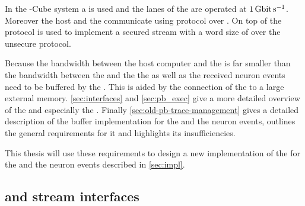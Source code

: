In the \BSSTwo{}-Cube\autocite{ref:bss_cube} system a \Xilinx{}  \FPGA{} is used and the \LVDS{} lanes of the \ASIC{} are operated at $\SI{1}{\giga\bit\per\second}$. Moreover the host and the \FPGA{} communicate using \UDP{} protocol over \Gigabitethernet{}. On top of \UDP{} the \HostARQ{}\autocite{ref:hostarq} protocol is used to implement a secured stream with a word size of \PhyWordSize{} over the unsecure \UDP{} protocol.

Because the bandwidth between the host computer and the \FPGA{} is far smaller than the bandwidth between the \FPGA{} and the \ASIC{} the \PlaybackProgram{} as well as the received neuron events need to be buffered by the \FPGA{}. This is aided by the connection of the \FPGA{} to a large external memory.
\autoref{sec:interfaces} and \autoref{sec:pb_exec} give a more detailed overview of the \FPGA{} and especially the \pbexec{}. Finally \autoref{sec:old-pb-trace-management} gives a detailed description of the buffer implementation for the \PlaybackProgram{} and the neuron events, outlines the general requirements for it and highlights its insufficiencies.

This thesis will use these requirements to design a new implementation of the for the \PlaybackProgram{} and the neuron events described in \autoref{sec:impl}.



\subsection{\AXI{} and stream interfaces}\label{sec:interfaces}
